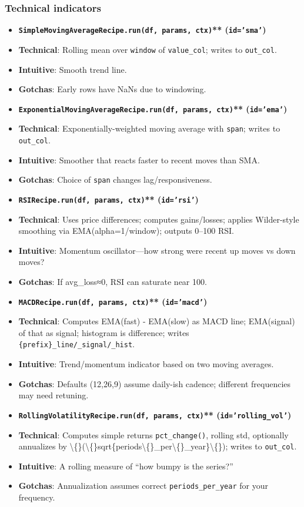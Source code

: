 \documentclass[11pt]{article}
\begin{document}
\subsubsection{Technical indicators}

\begin{itemize}[leftmargin=*,nosep]
\item \textbf{\texttt{SimpleMovingAverageRecipe.run(df, params, ctx)}** (\texttt{id='sma'})}
\item \textbf{Technical}: Rolling mean over \texttt{window} of \texttt{value\_col}; writes to \texttt{out\_col}.
\item \textbf{Intuitive}: Smooth trend line.
\item \textbf{Gotchas}: Early rows have NaNs due to windowing.
\item \textbf{\texttt{ExponentialMovingAverageRecipe.run(df, params, ctx)}** (\texttt{id='ema'})}
\item \textbf{Technical}: Exponentially-weighted moving average with \texttt{span}; writes to \texttt{out\_col}.
\item \textbf{Intuitive}: Smoother that reacts faster to recent moves than SMA.
\item \textbf{Gotchas}: Choice of \texttt{span} changes lag/responsiveness.
\item \textbf{\texttt{RSIRecipe.run(df, params, ctx)}** (\texttt{id='rsi'})}
\item \textbf{Technical}: Uses price differences; computes gains/losses; applies Wilder-style smoothing via EMA(alpha=1/window); outputs 0–100 RSI.
\item \textbf{Intuitive}: Momentum oscillator—how strong were recent up moves vs down moves?
\item \textbf{Gotchas}: If avg\_loss≈0, RSI can saturate near 100.
\item \textbf{\texttt{MACDRecipe.run(df, params, ctx)}** (\texttt{id='macd'})}
\item \textbf{Technical}: Computes EMA(fast) - EMA(slow) as MACD line; EMA(signal) of that as signal; histogram is difference; writes \texttt{\{prefix\}\_line/\_signal/\_hist}.
\item \textbf{Intuitive}: Trend/momentum indicator based on two moving averages.
\item \textbf{Gotchas}: Defaults (12,26,9) assume daily-ish cadence; different frequencies may need retuning.
\item \textbf{\texttt{RollingVolatilityRecipe.run(df, params, ctx)}** (\texttt{id='rolling\_vol'})}
\item \textbf{Technical}: Computes simple returns \texttt{pct\_change()}, rolling std, optionally annualizes by \textbackslash\{\}(\textbackslash\{\}sqrt\{periods\textbackslash\{\}\_per\textbackslash\{\}\_year\}\textbackslash\{\}); writes to \texttt{out\_col}.
\item \textbf{Intuitive}: A rolling measure of “how bumpy is the series?”
\item \textbf{Gotchas}: Annualization assumes correct \texttt{periods\_per\_year} for your frequency.
\end{itemize}
\end{document}
